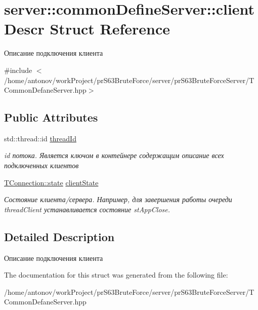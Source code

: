 \hypertarget{structserver_1_1common_define_server_1_1client_descr}{}\section{server\+:\+:common\+Define\+Server\+:\+:client\+Descr Struct Reference}
\label{structserver_1_1common_define_server_1_1client_descr}


Описание подключения клиента  




{\ttfamily \#include $<$/home/antonov/work\+Project/pr\+S63\+Brute\+Force/server/pr\+S63\+Brute\+Force\+Server/\+T\+Common\+Defane\+Server.\+hpp$>$}

\subsection*{Public Attributes}
\begin{DoxyCompactItemize}
\item 
\mbox{\label{structserver_1_1common_define_server_1_1client_descr_a301f7746deb69a26ca72ccce330446c1}} 
std\+::thread\+::id \hyperlink{structserver_1_1common_define_server_1_1client_descr_a301f7746deb69a26ca72ccce330446c1}{thread\+Id}
\begin{DoxyCompactList}\small\item\em id потока. Является ключом в контейнере содержащим описание всех подключенных клиентов \end{DoxyCompactList}\item 
\mbox{\label{structserver_1_1common_define_server_1_1client_descr_ac1848551f1c55e31df4cd4ed4ad25282}} 
\hyperlink{classconnection_1_1_t_connection_aee7dfb7510592bd2697ab6f906b9612c}{T\+Connection\+::state} \hyperlink{structserver_1_1common_define_server_1_1client_descr_ac1848551f1c55e31df4cd4ed4ad25282}{client\+State}
\begin{DoxyCompactList}\small\item\em Состояние клиента/сервера. Например, для завершения работы очереди thread\+Client устанавливается состояние st\+App\+Close. \end{DoxyCompactList}\end{DoxyCompactItemize}


\subsection{Detailed Description}
Описание подключения клиента 

The documentation for this struct was generated from the following file\+:\begin{DoxyCompactItemize}
\item 
/home/antonov/work\+Project/pr\+S63\+Brute\+Force/server/pr\+S63\+Brute\+Force\+Server/T\+Common\+Defane\+Server.\+hpp\end{DoxyCompactItemize}
